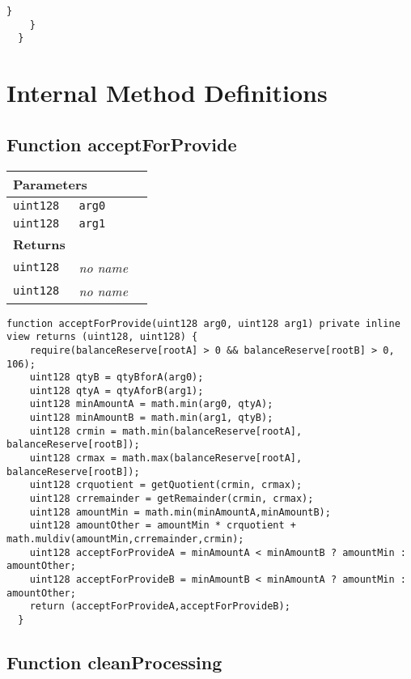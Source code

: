 \begin{lstlisting}[firstnumber=248]
      }
    }
  }
\end{lstlisting}

\section{Internal Method Definitions}


\subsection{Function acceptForProvide}


\ifsoltables
\noindent\begin{tabular}{|l|l|p{5cm}|}\hline
\multicolumn{3}{|l|}{\bf Parameters}\\\hline
\tt uint128 & \tt arg0 &\\\hline
\tt uint128 & \tt arg1 &\\\hline
\multicolumn{3}{|l|}{\bf Returns}\\\hline
\tt uint128 & {\em no name} &\\\hline
\tt uint128 & {\em no name} &\\\hline
\end{tabular}
\fi

\vspace{2cm}

\begin{lstlisting}[firstnumber=214]
  function acceptForProvide(uint128 arg0, uint128 arg1) private inline view returns (uint128, uint128) {
    require(balanceReserve[rootA] > 0 && balanceReserve[rootB] > 0, 106);
    uint128 qtyB = qtyBforA(arg0);
    uint128 qtyA = qtyAforB(arg1);
    uint128 minAmountA = math.min(arg0, qtyA);
    uint128 minAmountB = math.min(arg1, qtyB);
    uint128 crmin = math.min(balanceReserve[rootA], balanceReserve[rootB]);
    uint128 crmax = math.max(balanceReserve[rootA], balanceReserve[rootB]);
    uint128 crquotient = getQuotient(crmin, crmax);
    uint128 crremainder = getRemainder(crmin, crmax);
    uint128 amountMin = math.min(minAmountA,minAmountB);
    uint128 amountOther = amountMin * crquotient + math.muldiv(amountMin,crremainder,crmin);
    uint128 acceptForProvideA = minAmountA < minAmountB ? amountMin : amountOther;
    uint128 acceptForProvideB = minAmountB < minAmountA ? amountMin : amountOther;
    return (acceptForProvideA,acceptForProvideB);
  }
\end{lstlisting}

\subsection{Function cleanProcessing}


